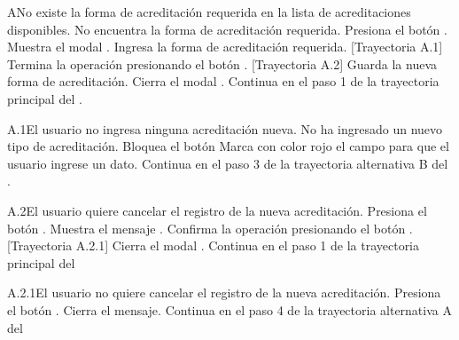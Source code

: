 
\begin{UCtrayectoriaA}{A}{No existe la forma de acreditación requerida en la lista de acreditaciones disponibles.}
    \UCpaso[\UCactor] No encuentra la forma de acreditación requerida.
    \UCpaso[\UCactor] Presiona el botón .
    \UCpaso Muestra el modal .
    \UCpaso[\UCactor] Ingresa la forma de acreditación requerida. [Trayectoria A.1]
    \UCpaso[\UCactor] Termina la operación presionando el botón . [Trayectoria A.2] 
    \UCpaso Guarda la nueva forma de acreditación.
    \UCpaso Cierra el modal .
    \UCpaso Continua en el paso 1 de la trayectoria principal del .
\end{UCtrayectoriaA}


\begin{UCtrayectoriaA}{A.1}{El usuario no ingresa ninguna acreditación nueva.}
    \UCpaso[\UCactor] No ha ingresado un nuevo tipo de acreditación.
    \UCpaso Bloquea el botón 
    \UCpaso Marca con color rojo el campo para que el usuario ingrese un dato.
    \UCpaso Continua en el paso 3 de la trayectoria alternativa B del .
\end{UCtrayectoriaA}


\begin{UCtrayectoriaA}{A.2}{El usuario quiere cancelar el registro de la nueva acreditación.}
    \UCpaso[\UCactor] Presiona el botón .
    \UCpaso Muestra el mensaje .
    \UCpaso[\UCactor] Confirma la operación presionando el botón . [Trayectoria A.2.1]
    \UCpaso Cierra el modal .
    \UCpaso Continua en el paso 1 de la trayectoria principal del 
\end{UCtrayectoriaA}


\begin{UCtrayectoriaA}{A.2.1}{El usuario no quiere cancelar el registro de la nueva acreditación.}
    \UCpaso[\UCactor] Presiona el botón .
    \UCpaso Cierra el mensaje.
    \UCpaso Continua en el paso 4 de la trayectoria alternativa A del 
\end{UCtrayectoriaA}

